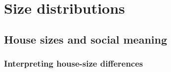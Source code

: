 \documentclass[
  12pt,
  a4paper, twoside]{book}
\begin{document}
\hypertarget{part-size-distributions}{%
\part{Size distributions}\label{part-size-distributions}}

\hypertarget{house-sizes-theory}{%
\chapter{House sizes and social meaning}\label{house-sizes-theory}}

\hypertarget{house-sizes-ethno}{%
\section{Interpreting house-size differences}\label{house-sizes-ethno}}
\end{document}
